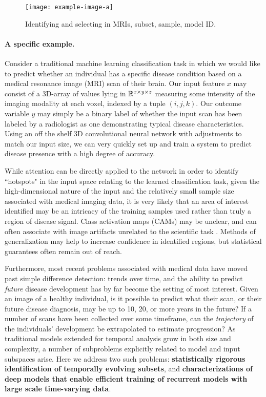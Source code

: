 \begin{figure}
    \centering
    \texttt{[image: example-image-a]}
    \caption[A simple subset selection example]{\color{red} Identifying and selecting in MRIs, subset, sample, model ID.}
\end{figure}

\paragraph{A specific example.} Consider a traditional machine learning classification task in which we would like to predict whether an individual has a specific disease condition based on a medical resonance image (MRI) scan of their brain. Our input feature $x$ may consist of a 3D-array of values lying in $\mathbb{R}^{x\times y\times z}$ measuring some intensity of the imaging modality at each voxel, indexed by a tuple $(i,j,k)$.
Our outcome variable $y$ may simply be a binary label of whether the input scan has been labeled by a radiologist as one demonstrating typical disease characteristics.
Using an off the shelf 3D convolutional neural network with adjustments to match our input size, we can very quickly set up and train a system to predict disease presence with a high degree of accuracy.

While attention can be directly applied to the network in order to identify ``hotspots" in the input space relating to the learned classification task, 
given the high-dimensional nature of the input
and the relatively small sample size 
associated with medical imaging data, 
it is very likely that an area of interest identified
may be an intricacy of the training samples used rather than truly a region of disease signal.
Class activation maps (CAMs) may be unclear, and can often associate with image artifacts unrelated to the scientific task \citep{adebayo2018sanity}.
Methods of generalization may help to increase confidence in identified regions, but statistical guarantees often remain out of reach.

Furthermore, most recent problems associated with medical data have moved past simple difference detection: trends over time, and the ability to predict {\em future} disease development has by far become the setting of most interest.
Given an image of a healthy individual, is it possible to predict what their scan, or their future disease diagnosis, may be up to 10, 20, or more years in the future?
If a number of scans have been collected over some timeframe, can the \textit{trajectory} of the individuals' development be extrapolated to estimate progression?
As traditional models extended for temporal analysis grow in both size and complexity,
a number of subproblems explicitly related to model and input subspaces arise. Here we address two such problems: \textbf{statistically rigorous identification of temporally evolving subsets}, and \textbf{characterizations of deep models that enable efficient training of recurrent models with large scale time-varying data}.


